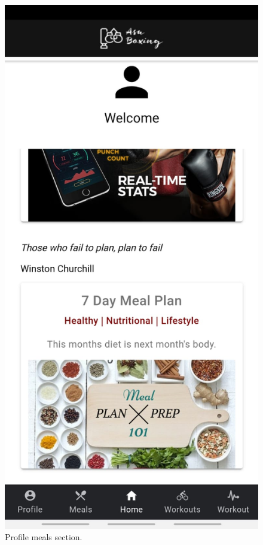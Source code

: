 \documentclass[a4paper,12pt]{report}
\begin{document}
\begin{figure}[ht]
\begin{center}
\begin{minipage}[b]{0.5\linewidth}
    \includegraphics[width=.7\linewidth]{images/aplicationImages/homePageBottom.jpeg} 
    \caption{Profile meals section.} 
    \vspace{4ex}
  \end{minipage}%
  \end{center}
\end{figure}
\end{document}
